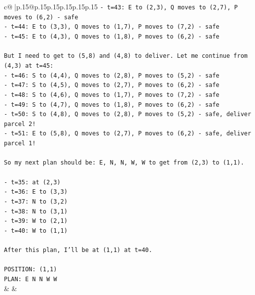 \documentclass{article}
\begin{document}
{\begin{supertabular}{c@{$\;$}|p{.15\linewidth}@{}p{.15\linewidth}p{.15\linewidth}p{.15\linewidth}p{.15\linewidth}p{.15\linewidth}}
{{{\texttt{{-} t=43: E to (2,3), Q moves to (2,7), P moves to (6,2) {-} safe} \\
\texttt{{-} t=44: E to (3,3), Q moves to (1,7), P moves to (7,2) {-} safe} \\
\texttt{{-} t=45: E to (4,3), Q moves to (1,8), P moves to (6,2) {-} safe} \\
\\ 
\texttt{But I need to get to (5,8) and (4,8) to deliver. Let me continue from (4,3) at t=45:} \\
\texttt{{-} t=46: S to (4,4), Q moves to (2,8), P moves to (5,2) {-} safe} \\
\texttt{{-} t=47: S to (4,5), Q moves to (2,7), P moves to (6,2) {-} safe} \\
\texttt{{-} t=48: S to (4,6), Q moves to (1,7), P moves to (7,2) {-} safe} \\
\texttt{{-} t=49: S to (4,7), Q moves to (1,8), P moves to (6,2) {-} safe} \\
\texttt{{-} t=50: S to (4,8), Q moves to (2,8), P moves to (5,2) {-} safe, deliver parcel 2!} \\
\texttt{{-} t=51: E to (5,8), Q moves to (2,7), P moves to (6,2) {-} safe, deliver parcel 1!} \\
\\ 
\texttt{So my next plan should be: E, N, N, W, W to get from (2,3) to (1,1).} \\
\\ 
\texttt{{-} t=35: at (2,3)} \\
\texttt{{-} t=36: E to (3,3)} \\
\texttt{{-} t=37: N to (3,2)} \\
\texttt{{-} t=38: N to (3,1)} \\
\texttt{{-} t=39: W to (2,1)} \\
\texttt{{-} t=40: W to (1,1)} \\
\\ 
\texttt{After this plan, I'll be at (1,1) at t=40.} \\
\\ 
\texttt{POSITION: (1,1)} \\
\texttt{PLAN: E N N W W} \\
            }
        }
    }
    & & \\ \\


\end{supertabular}}
\end{document}
